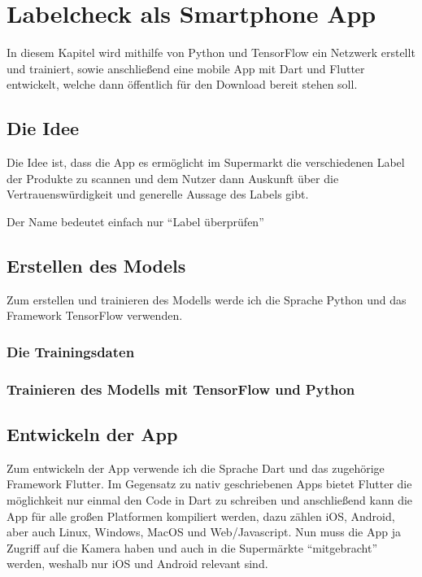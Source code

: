 \section{Labelcheck als Smartphone App}

In diesem Kapitel wird mithilfe von Python und TensorFlow ein Netzwerk erstellt und trainiert, sowie anschließend eine mobile App mit Dart und Flutter entwickelt, welche dann öffentlich für den Download bereit stehen soll.

\subsection{Die Idee}

Die Idee ist, dass die App es ermöglicht im Supermarkt die verschiedenen Label der Produkte zu scannen und dem Nutzer dann Auskunft über die Vertrauenswürdigkeit und generelle Aussage des Labels gibt.

Der Name bedeutet einfach nur "`Label überprüfen"'

\subsection{Erstellen des Models}\label{erstellen des modells}

Zum erstellen und trainieren des Modells werde ich die Sprache Python und das Framework TensorFlow verwenden.

\subsubsection{Die Trainingsdaten}

\subsubsection{Trainieren des Modells mit TensorFlow und Python}

\subsection{Entwickeln der App}

Zum entwickeln der App verwende ich die Sprache Dart und das zugehörige Framework Flutter. Im Gegensatz zu nativ geschriebenen Apps bietet Flutter die möglichkeit nur einmal den Code in Dart zu schreiben und anschließend kann die App für alle großen Platformen kompiliert werden, dazu zählen iOS, Android, aber auch Linux, Windows, MacOS und Web/Javascript. Nun muss die App ja Zugriff auf die Kamera haben und auch in die Supermärkte "`mitgebracht"' werden, weshalb nur iOS und Android relevant sind.

